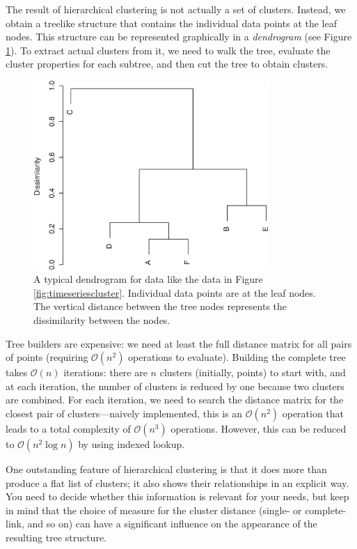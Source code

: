 The result of hierarchical clustering is not actually a set of
clusters.  Instead, we obtain a treelike structure that contains the
individual data points at the leaf nodes. This structure can be
represented graphically in a \emph{dendrogram}  (see Figure
\ref{fig:dendrogram}). To extract actual clusters from it, we need to
walk the tree, evaluate the cluster properties for each subtree, and
then cut the tree to obtain clusters.

\begin{figure}
  \centerline{\includegraphics[width=0.8\textwidth]{img/dendrogram}}
  \caption{A typical dendrogram for data like the data in Figure
    \ref{fig:timeseriescluster}. Individual data points are at the
    leaf nodes. The vertical distance between the tree nodes
    represents the dissimilarity between the nodes.}
  \label{fig:dendrogram}
\end{figure}

Tree builders are expensive: we need at least the full distance matrix
for all pairs of points (requiring $\mathcal{O}(n^2)$ operations to
evaluate). Building the complete tree takes $\mathcal{O}(n)$
iterations: there are $n$ clusters (initially, points) to start with,
and at each iteration, the number of clusters is reduced by one because
two clusters are combined. For each iteration, we need to search the
distance matrix for the closest pair of clusters---naively
implemented, this is an $\mathcal{O}(n^2)$ operation  that leads to a
total complexity of $\mathcal{O}(n^3)$ operations. However, this can
be reduced to $\mathcal{O}(n^2 \log n)$ by using indexed lookup.

One outstanding feature of hierarchical clustering is that it does
more than produce a flat list of clusters; it also shows their
relationships in an explicit way. You need to decide whether this
information is relevant for your needs, but keep in mind that the
choice of measure for the cluster distance (single- or complete-link,
and so on) can have a significant influence on the appearance of the
resulting tree structure.

